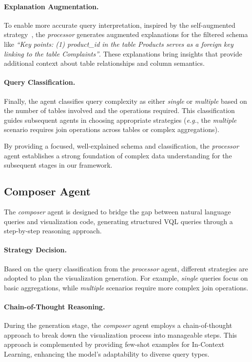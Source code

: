 \paragraph{Explanation Augmentation.}
To enable more accurate query interpretation, inspired by the self-augmented strategy~\cite{augment}, the \textit{processor} generates augmented explanations for the filtered schema like \textit{``Key points: (1) product\_id in the table Products serves as a foreign key linking to the table Complaints''}. These explanations bring insights that provide additional context about table relationships and column semantics. 

\paragraph{Query Classification.}
Finally, the agent classifies query complexity as either \textit{single} or \textit{multiple} based on the number of tables involved and the operations required. This classification guides subsequent agents in choosing appropriate strategies (\emph{e.g.}, the \textit{multiple} scenario requires join operations across tables or complex aggregations).

By providing a focused, well-explained schema and classification, the \textit{processor} agent establishes a strong foundation of complex data understanding for the subsequent stages in our framework.


\subsection{Composer Agent} 
\label{Composer}

The \textit{composer} agent is designed to bridge the gap between natural language queries and visualization code, generating structured VQL queries through a step-by-step reasoning approach. 

\paragraph{Strategy Decision.}
Based on the query classification from the \textit{processor} agent, different strategies are adopted to plan the visualization generation. For example, \textit{single} queries focus on basic aggregations, while \textit{multiple} scenarios require more complex join operations.

\paragraph{Chain-of-Thought Reasoning.}
During the generation stage, the \textit{composer} agent employs a chain-of-thought~\cite{wei2022chain} approach to break down the visualization process into manageable steps. This approach is complemented by providing few-shot examples for In-Context Learning, enhancing the model's adaptability to diverse query types.

